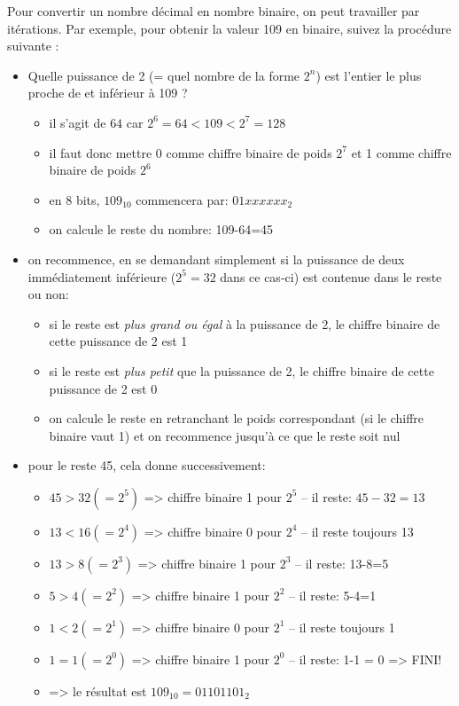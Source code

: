 Pour convertir un nombre décimal en nombre binaire, on peut travailler par itérations.
Par exemple, pour obtenir la valeur 109 en binaire, suivez la procédure suivante :

\begin{itemize}
\item Quelle puissance de 2 (= quel nombre de la forme $2^n$) est l’entier le plus proche de et inférieur à 109 ?
	\begin{itemize}
	\item il s'agit de $64$ car $2^6=64 < 109 < 2^7=128$
	\item il faut donc mettre 0 comme chiffre binaire de poids $2^7$ et 1 comme chiffre binaire de poids $2^6$
	\item en 8 bits, $109_{10}$ commencera par: $01xxxxxx_2$
	\item on calcule le reste du nombre: 109-64=45
	\end{itemize}

\item on recommence, en se demandant simplement si la puissance de deux immédiatement inférieure ($2^5=32$ dans ce cas-ci) est contenue dans le reste ou non:
	\begin{itemize}
	\item si le reste est \textit{plus grand ou égal} à la puissance de 2, le chiffre binaire de cette puissance de 2 est 1
	\item si le reste est \textit{plus petit} que la puissance de 2, le chiffre binaire de cette puissance de 2 est 0
	\item on calcule le reste en retranchant le poids correspondant (si le chiffre binaire vaut 1) et on recommence jusqu'à ce que le reste soit nul
	\end{itemize}

\item pour le reste 45, cela donne successivement:
	\begin{itemize}
	\item $45 > 32 (= 2^5)$ => chiffre binaire 1 pour $2^5$ – il reste: $45-32=13$
	\item $13 < 16 (= 2^4 )$ => chiffre binaire 0 pour $2^4$ – il reste toujours 13
	\item $13 > 8 (= 2^3 )$ => chiffre binaire 1 pour $2^3$ – il reste: 13-8=5
	\item $5 > 4 (= 2^2 )$ => chiffre binaire 1 pour $2^2$ – il reste: 5-4=1
	\item $1 < 2 (= 2^1 )$ => chiffre binaire 0 pour $2^1$ – il reste toujours 1
	\item $1 = 1 (= 2^0 )$ => chiffre binaire 1 pour $2^0$ – il reste: 1-1 = 0 => FINI!
	\item => le résultat est $109_{10} = 01101101_2$
	\end{itemize}
\end{itemize}

